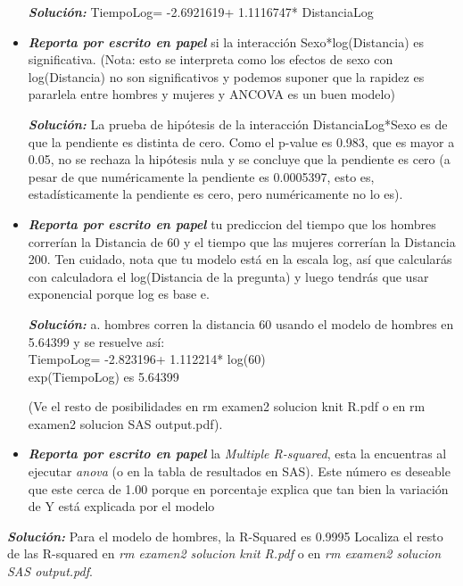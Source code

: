 \documentclass[letterpaper,11pt]{article}
\begin{document}
\begin{itemize}
\textbf{\textit{Soluci\'on:}} TiempoLog= -2.6921619+ 1.1116747* DistanciaLog


\item \textbf{\textit{Reporta por escrito en papel}} si la interacci\'on Sexo*log(Distancia) es significativa.
(Nota: esto se interpreta como los efectos de sexo con log(Distancia) no son significativos y podemos 
suponer que la rapidez es pararlela entre hombres y mujeres y ANCOVA es un buen modelo)

\textbf{\textit{Soluci\'on:}} La prueba de hip\'otesis de la interacci\'on DistanciaLog*Sexo es de que la pendiente es distinta de cero.
Como el p-value es 0.983, que es mayor a 0.05, no se rechaza la hip\'otesis nula y se concluye que la pendiente es cero (a pesar de que
num\'ericamente la pendiente es 0.0005397, esto es, estad\'isticamente la pendiente es cero, pero num\'ericamente no lo es).

\item \textbf{\textit{Reporta por escrito en papel}} tu prediccion del tiempo que los hombres correr\'ian la Distancia de 60
y el tiempo que las mujeres correr\'ian la Distancia 200. Ten cuidado, nota que tu modelo est\'a en la escala log,
as\'i que calcular\'as con calculadora el log(Distancia de la pregunta) y luego tendr\'as que usar exponencial
porque log es base e.

\textbf{\textit{Soluci\'on:}} a. hombres corren la distancia 60 usando el modelo de hombres en 5.64399 y se resuelve as\'i: \\
TiempoLog= -2.823196+ 1.112214* log(60) \\
exp(TiempoLog) es 5.64399

(Ve el resto de posibilidades en rm examen2 solucion knit R.pdf o en rm examen2 solucion SAS output.pdf).

\item \textbf{\textit{Reporta por escrito en papel}} la \textit{Multiple R-squared}, esta la encuentras al 
ejecutar \textit{anova} (o en la tabla de resultados en SAS). Este n\'umero es deseable que este cerca de 1.00 porque en porcentaje explica 
que tan bien la variaci\'on de Y est\'a explicada por el modelo
\end{itemize}

\textbf{\textit{Soluci\'on:}} Para el modelo de hombres, la R-Squared es 0.9995
Localiza el resto de las R-squared en \textit{rm examen2 solucion knit R.pdf} o en \textit{rm examen2 solucion SAS output.pdf}.

\end{document}
